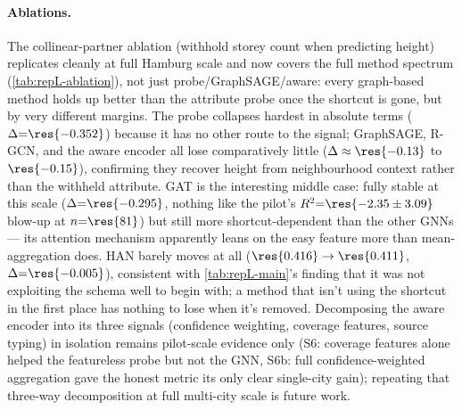 \paragraph{Ablations.} The collinear-partner ablation (withhold storey count
when predicting height) replicates cleanly at full Hamburg scale and now
covers the full method spectrum (\cref{tab:repL-ablation}), not just
probe/GraphSAGE/aware: every graph-based method holds up better than the
attribute probe once the shortcut is gone, but by very different margins. The
probe collapses hardest in absolute terms ($\Delta{=}\res{-0.352}$) because it
has no other route to the signal; GraphSAGE, R-GCN, and the aware encoder all
lose comparatively little ($\Delta\approx\res{-0.13}$ to $\res{-0.15}$),
confirming they recover height from neighbourhood context rather than the
withheld attribute. GAT is the interesting middle case: fully stable at this
scale ($\Delta{=}\res{-0.295}$, nothing like the pilot's $R^2{=}\res{-2.35\pm3.09}$
blow-up at $n{=}\res{81}$) but still more shortcut-dependent than the other
GNNs --- its attention mechanism apparently leans on the easy feature more
than mean-aggregation does. HAN barely moves at all
($\res{0.416}\to\res{0.411}$, $\Delta{=}\res{-0.005}$), consistent with
\cref{tab:repL-main}'s finding that it was not exploiting the schema well to
begin with; a method that isn't using the shortcut in the first place has
nothing to lose when it's removed. Decomposing the aware encoder into its
three signals (confidence weighting, coverage features, source typing) in
isolation remains pilot-scale evidence only (S6: coverage features alone
helped the featureless probe but not the GNN, S6b: full confidence-weighted
aggregation gave the honest metric its only clear single-city gain); repeating
that three-way decomposition at full multi-city scale is future work.

